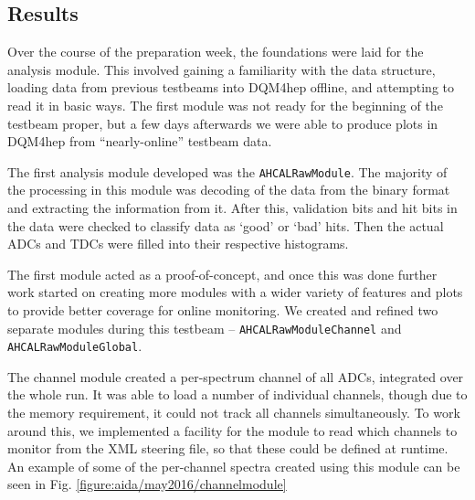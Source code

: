 \subsection{Results}
Over the course of the preparation week, the foundations were laid for the analysis module. This involved gaining a familiarity with the data structure, loading data from previous testbeams into \acrshort{DQM4hep} offline, and attempting to read it in basic ways. The first module was not ready for the beginning of the testbeam proper, but a few days afterwards we were able to produce plots in \acrshort{DQM4hep} from ``nearly-online'' testbeam data.

The first analysis module developed was the \texttt{AHCALRawModule}. The majority of the processing in this module was decoding of the data from the binary format and extracting the information from it. After this, validation bits and hit bits in the data were checked to classify data as `good' or `bad' hits. Then the actual \acrshort{ADC}s and \acrshort{TDC}s were filled into their respective histograms. 

The first module acted as a proof-of-concept, and once this was done further work started on creating more modules with a wider variety of features and plots to provide better coverage for online monitoring. We created and refined two separate modules during this testbeam -- \texttt{AHCALRawModuleChannel} and \texttt{AHCALRawModuleGlobal}. 

The channel module created a per-spectrum channel of all \acrshort{ADC}s, integrated over the whole run. It was able to load a number of individual channels, though due to the memory requirement, it could not track all channels simultaneously. To work around this, we implemented a facility for the module to read which channels to monitor from the \acrshort{XML} steering file, so that these could be defined at runtime. An example of some of the per-channel spectra created using this module can be seen in Fig. \ref{figure:aida/may2016/channelmodule}

